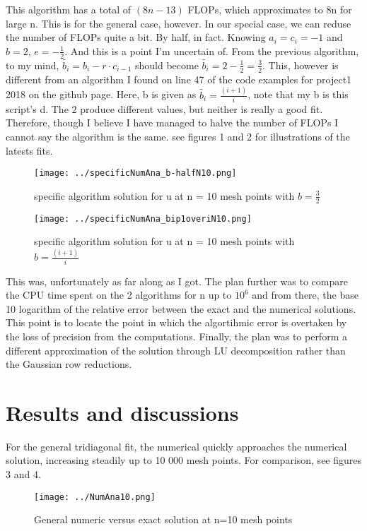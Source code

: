 \documentclass[10pt, twocolumn]{revtex4-1}
\begin{document}
This algorithm has a total of $(8n-13)$ FLOPs, which approximates to 8n for large n. This is for the general case, however. In our special case, we can reduse the number of FLOPs quite a bit. By half, in fact. 
Knowing $a_i = c_{i} = -1$ and $b=2$, $e = -\frac{1}{2}$. And this is a point I'm uncertain of. From the previous algorithm, to my mind, $\tilde{b_{i}} = b_{i} - r \cdot c_{i-1}$ should become $\tilde{b_i}=2-\frac{1}{2}=\frac{3}{2}$. This, however is different from an algorithm I found on line 47 of the code examples for project1 2018 on the github page. Here, b is given as $\tilde{b_i} = \frac{(i+1)}{i}$, note that my b is this script's d. The 2 produce different values, but neither is really a good fit. Therefore, though I believe I have managed to halve the number of FLOPs I cannot say the algorithm is the same. see figures 1 and 2 for illustrations of the latests fits.

\begin{figure}[hbtp]
\texttt{[image: ../specificNumAna\_b-halfN10.png]}
\caption{specific algorithm solution for u at n = 10 mesh points with $b=\frac{3}{2}$} 
\end{figure}

\begin{figure}[hbtp]
\texttt{[image: ../specificNumAna\_bip1overiN10.png]}
\caption{specific algorithm solution for u at n = 10 mesh points with $b=\frac{(i+1)}{i}$} 
\end{figure}
This was, unfortunately as far along as I got. The plan further was to compare the CPU time spent on the 2 algorithms for n up to $10^6$ and from there, the base 10 logarithm of the relative error between the exact and the numerical solutions. This point is to locate the point in which the algortihmic error is overtaken by the loss of precision from the computations. Finally, the plan was to perform a different approximation of the solution through LU decomposition rather than the Gaussian row reductions. 

\section{Results and discussions}
For the general tridiagonal fit, the numerical quickly approaches the numerical solution, increasing steadily up to 10 000 mesh points. For comparison, see figures 3 and 4.
\begin{figure}[hbtp]
\texttt{[image: ../NumAna10.png]}
\caption{General numeric versus exact solution at n=10 mesh points} 
\end{figure}
\end{document}
